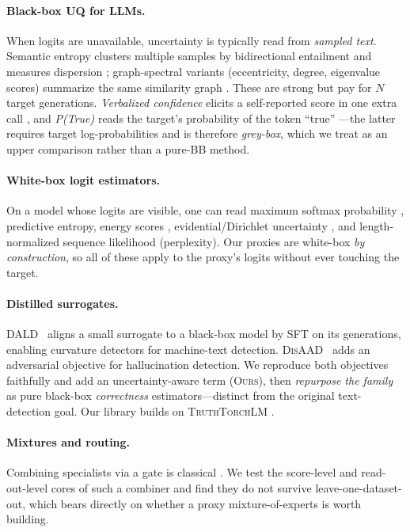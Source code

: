 \documentclass[11pt]{article}
\newcommand{\ours}{\textsc{Ours}}
\newcommand{\dald}{\textsc{DALD}}
\newcommand{\disaad}{\textsc{DisAAD}}
\begin{document}
\paragraph{Black-box UQ for LLMs.} When logits are unavailable, uncertainty is
typically read from \emph{sampled text}. Semantic entropy clusters multiple samples by
bidirectional entailment and measures dispersion
\citep{kuhn2023semantic,farquhar2024detecting}; graph-spectral variants
(eccentricity, degree, eigenvalue scores) summarize the same similarity graph
\citep{lin2024generating}. These are strong but pay for $N$ target generations.
\emph{Verbalized confidence} elicits a self-reported score in one extra call
\citep{lin2022teaching}, and \emph{P(True)} reads the target's probability of the token
``true'' \citep{kadavath2022language}---the latter requires target log-probabilities and
is therefore \emph{grey-box}, which we treat as an upper comparison rather than a
pure-BB method.

\paragraph{White-box logit estimators.} On a model whose logits are visible, one can
read maximum softmax probability \citep{hendrycks2017baseline}, predictive entropy,
energy scores \citep{liu2020energy}, evidential/Dirichlet uncertainty
\citep{sensoy2018evidential,malinin2021uncertainty}, and length-normalized sequence
likelihood (perplexity). Our proxies are white-box \emph{by construction}, so all of
these apply to the proxy's logits without ever touching the target.

\paragraph{Distilled surrogates.} \dald~\citep{zeng2024dald} aligns a small surrogate
to a black-box model by SFT on its generations, enabling curvature detectors
\citep{bao2024fastdetectgpt} for machine-text detection. \disaad~\citep{cui2026disaad}
adds an adversarial objective for hallucination detection. We reproduce both objectives
faithfully and add an uncertainty-aware term (\ours), then \emph{repurpose the family}
as pure black-box \emph{correctness} estimators---distinct from the original
text-detection goal. Our library builds on \textsc{TruthTorchLM}
\citep{bakman2024truthtorchlm}.

\paragraph{Mixtures and routing.} Combining specialists via a gate is classical
\citep{jacobs1991moe}. We test the score-level and read-out-level cores of such a
combiner and find they do not survive leave-one-dataset-out, which bears directly on
whether a proxy mixture-of-experts is worth building.
\end{document}
